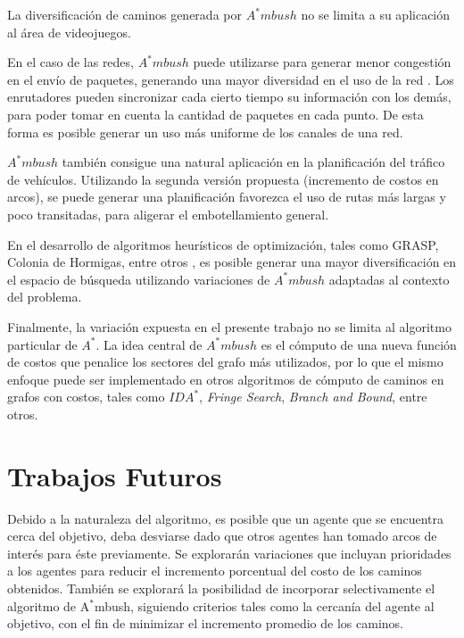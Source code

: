 \documentclass{egpubl}
\begin{document}
La diversificación de caminos generada por $A^*mbush$ no se limita a su
aplicación al área de videojuegos.

En el caso de las redes, $A^*mbush$ puede utilizarse para generar menor 
congestión en el envío de paquetes, generando una mayor diversidad
en el uso de la red \cite{TMSV03}. Los enrutadores pueden sincronizar 
cada cierto tiempo su información con los demás, para poder tomar 
en cuenta la cantidad de paquetes en cada punto. De esta forma es
posible generar un uso más uniforme de los canales de una red.

$A^*mbush$ también consigue una natural aplicación en la planificación
del tráfico de vehículos. Utilizando la segunda versión propuesta
(incremento de costos en arcos), se puede generar una planificación
favorezca el uso de rutas más largas y poco transitadas, para aligerar el embotellamiento general.

En el desarrollo de algoritmos heurísticos de optimización, tales
como GRASP, Colonia de Hormigas, entre otros \cite{GP10}, es posible generar
una mayor diversificación en el espacio de búsqueda utilizando
variaciones de $A^*mbush$ adaptadas al contexto del problema.

Finalmente, la variación expuesta en el presente trabajo no se
limita al algoritmo particular de $A^*$. La idea
central de $A^*mbush$ es el cómputo de una nueva función de
costos que penalice los sectores del grafo más utilizados, por
lo que el mismo enfoque puede ser implementado en otros algoritmos
de cómputo de caminos en grafos con costos, tales como $IDA^*$,
\textit{Fringe Search}, \textit{Branch and Bound}, entre otros.

\section{Trabajos Futuros}

Debido a la naturaleza del algoritmo, es posible que un agente
que se encuentra cerca del objetivo, deba desviarse dado que
otros agentes han tomado arcos de interés para éste previamente.
Se explorarán variaciones que incluyan prioridades a los agentes
para reducir el incremento porcentual del costo de los caminos
obtenidos. También se explorará la posibilidad de incorporar
selectivamente el algoritmo de A$^*$mbush, siguiendo criterios
tales como la cercanía del agente al objetivo, con el fin de
minimizar el incremento promedio de los caminos.

\end{document}

